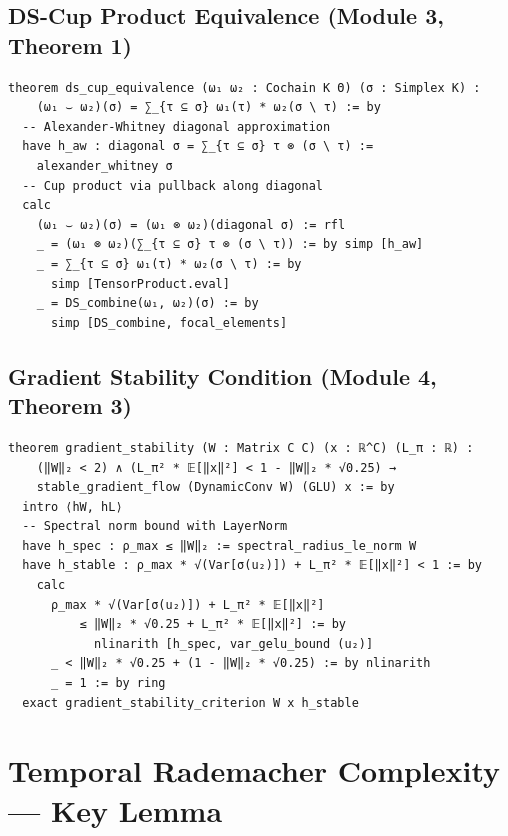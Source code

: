 \subsection{DS-Cup Product Equivalence (Module 3, Theorem 1)}

\begin{verbatim}
theorem ds_cup_equivalence (ω₁ ω₂ : Cochain K Θ) (σ : Simplex K) :
    (ω₁ ⌣ ω₂)(σ) = ∑_{τ ⊆ σ} ω₁(τ) * ω₂(σ \ τ) := by
  -- Alexander-Whitney diagonal approximation
  have h_aw : diagonal σ = ∑_{τ ⊆ σ} τ ⊗ (σ \ τ) :=
    alexander_whitney σ
  -- Cup product via pullback along diagonal
  calc
    (ω₁ ⌣ ω₂)(σ) = (ω₁ ⊗ ω₂)(diagonal σ) := rfl
    _ = (ω₁ ⊗ ω₂)(∑_{τ ⊆ σ} τ ⊗ (σ \ τ)) := by simp [h_aw]
    _ = ∑_{τ ⊆ σ} ω₁(τ) * ω₂(σ \ τ) := by
      simp [TensorProduct.eval]
    _ = DS_combine(ω₁, ω₂)(σ) := by
      simp [DS_combine, focal_elements]
\end{verbatim}

\subsection{Gradient Stability Condition (Module 4, Theorem 3)}

\begin{verbatim}
theorem gradient_stability (W : Matrix C C) (x : ℝ^C) (L_π : ℝ) :
    (‖W‖₂ < 2) ∧ (L_π² * 𝔼[‖x‖²] < 1 - ‖W‖₂ * √0.25) →
    stable_gradient_flow (DynamicConv W) (GLU) x := by
  intro ⟨hW, hL⟩
  -- Spectral norm bound with LayerNorm
  have h_spec : ρ_max ≤ ‖W‖₂ := spectral_radius_le_norm W
  have h_stable : ρ_max * √(Var[σ(u₂)]) + L_π² * 𝔼[‖x‖²] < 1 := by
    calc
      ρ_max * √(Var[σ(u₂)]) + L_π² * 𝔼[‖x‖²]
          ≤ ‖W‖₂ * √0.25 + L_π² * 𝔼[‖x‖²] := by
            nlinarith [h_spec, var_gelu_bound (u₂)]
      _ < ‖W‖₂ * √0.25 + (1 - ‖W‖₂ * √0.25) := by nlinarith
      _ = 1 := by ring
  exact gradient_stability_criterion W x h_stable
\end{verbatim}

\section{Temporal Rademacher Complexity — Key Lemma}

